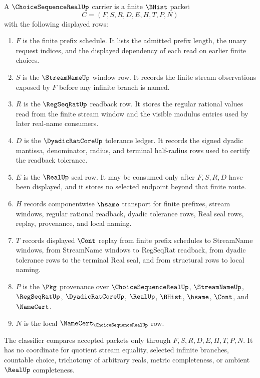 \begin{definition}
\label{def:choice-sequence-real-carrier}
A $\ChoiceSequenceRealUp$ carrier is a finite $\BHist$ packet
$$
C=(F,S,R,D,E,H,T,P,N)
$$
with the following displayed rows:
\begin{enumerate}
\item $F$ is the finite prefix schedule. It lists the admitted prefix length, the unary request indices, and the displayed dependency of each read on earlier finite choices.
\item $S$ is the $\StreamNameUp$ window row. It records the finite stream observations exposed by $F$ before any infinite branch is named.
\item $R$ is the $\RegSeqRatUp$ readback row. It stores the regular rational values read from the finite stream window and the visible modulus entries used by later real-name consumers.
\item $D$ is the $\DyadicRatCoreUp$ tolerance ledger. It records the signed dyadic mantissa, denominator, radius, and terminal half-radius rows used to certify the readback tolerance.
\item $E$ is the $\RealUp$ seal row. It may be consumed only after $F,S,R,D$ have been displayed, and it stores no selected endpoint beyond that finite route.
\item $H$ records componentwise $\hsame$ transport for finite prefixes, stream windows, regular rational readback, dyadic tolerance rows, Real seal rows, replay, provenance, and local naming.
\item $T$ records displayed $\Cont$ replay from finite prefix schedules to StreamName windows, from StreamName windows to RegSeqRat readback, from dyadic tolerance rows to the terminal Real seal, and from structural rows to local naming.
\item $P$ is the $\Pkg$ provenance over $\ChoiceSequenceRealUp$, $\StreamNameUp$, $\RegSeqRatUp$, $\DyadicRatCoreUp$, $\RealUp$, $\BHist$, $\hsame$, $\Cont$, and $\NameCert$.
\item $N$ is the local $\NameCert_{\ChoiceSequenceRealUp}$ row.
\end{enumerate}
The classifier compares accepted packets only through $F,S,R,D,E,H,T,P,N$. It has no coordinate for quotient stream equality, selected infinite branches, countable choice, trichotomy of arbitrary reals, metric completeness, or ambient $\RealUp$ completeness.
\end{definition}

